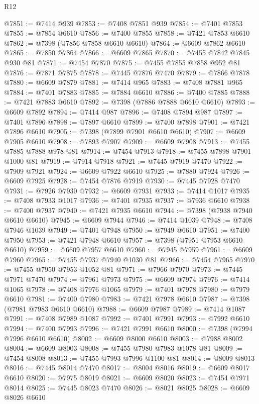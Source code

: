 \begin{lexlean}{R12}
\begin{coremodule}
{{{{{{{{{{{{{{{{{{{{{{{{{{{{{{{{{{{{{{{{{{{{{{{{{{{{{{{{{{{{{{{{{{{{{{{{{{{{{{{{{{@7851 := @7414 @939
@7853 := @7408 @7851 @939
@7854 := @7401 @7853
@7855 := @7854 @6610
@7856 := @7400 @7855
@7858 := @7421 @7853 @6610
@7862 := @7398 (@7856 @7858 @6610 @6610)
@7864 := @6609 @7862 @6610
@7865 := @7850 @7864
@7866 := @6609 @7865
@7870 := @7455 @7842 @7845 @930 @81
@7871 := @7454 @7870
@7875 := @7455 @7855 @7858 @952 @81
@7876 := @7871 @7875
@7878 := @7445 @7876 @7470
@7879 := @7866 @7878
@7880 := @6609 @7879
@7881 := @7414 @965
@7883 := @7408 @7881 @965
@7884 := @7401 @7883
@7885 := @7884 @6610
@7886 := @7400 @7885
@7888 := @7421 @7883 @6610
@7892 := @7398 (@7886 @7888 @6610 @6610)
@7893 := @6609 @7892
@7894 := @7414 @987
@7896 := @7408 @7894 @987
@7897 := @7401 @7896
@7898 := @7897 @6610
@7899 := @7400 @7898
@7901 := @7421 @7896 @6610
@7905 := @7398 (@7899 @7901 @6610 @6610)
@7907 := @6609 @7905 @6610
@7908 := @7893 @7907
@7909 := @6609 @7908
@7913 := @7455 @7885 @7888 @978 @81
@7914 := @7454 @7913
@7918 := @7455 @7898 @7901 @1000 @81
@7919 := @7914 @7918
@7921 := @7445 @7919 @7470
@7922 := @7909 @7921
@7924 := @6609 @7922 @6610
@7925 := @7880 @7924
@7926 := @6609 @7925
@7928 := @7454 @7876 @7919
@7930 := @7445 @7928 @7470
@7931 := @7926 @7930
@7932 := @6609 @7931
@7933 := @7414 @1017
@7935 := @7408 @7933 @1017
@7936 := @7401 @7935
@7937 := @7936 @6610
@7938 := @7400 @7937
@7940 := @7421 @7935 @6610
@7944 := @7398 (@7938 @7940 @6610 @6610)
@7945 := @6609 @7944
@7946 := @7414 @1039
@7948 := @7408 @7946 @1039
@7949 := @7401 @7948
@7950 := @7949 @6610
@7951 := @7400 @7950
@7953 := @7421 @7948 @6610
@7957 := @7398 (@7951 @7953 @6610 @6610)
@7959 := @6609 @7957 @6610
@7960 := @7945 @7959
@7961 := @6609 @7960
@7965 := @7455 @7937 @7940 @1030 @81
@7966 := @7454 @7965
@7970 := @7455 @7950 @7953 @1052 @81
@7971 := @7966 @7970
@7973 := @7445 @7971 @7470
@7974 := @7961 @7973
@7975 := @6609 @7974
@7976 := @7414 @1065
@7978 := @7408 @7976 @1065
@7979 := @7401 @7978
@7980 := @7979 @6610
@7981 := @7400 @7980
@7983 := @7421 @7978 @6610
@7987 := @7398 (@7981 @7983 @6610 @6610)
@7988 := @6609 @7987
@7989 := @7414 @1087
@7991 := @7408 @7989 @1087
@7992 := @7401 @7991
@7993 := @7992 @6610
@7994 := @7400 @7993
@7996 := @7421 @7991 @6610
@8000 := @7398 (@7994 @7996 @6610 @6610)
@8002 := @6609 @8000 @6610
@8003 := @7988 @8002
@8004 := @6609 @8003
@8008 := @7455 @7980 @7983 @1078 @81
@8009 := @7454 @8008
@8013 := @7455 @7993 @7996 @1100 @81
@8014 := @8009 @8013
@8016 := @7445 @8014 @7470
@8017 := @8004 @8016
@8019 := @6609 @8017 @6610
@8020 := @7975 @8019
@8021 := @6609 @8020
@8023 := @7454 @7971 @8014
@8025 := @7445 @8023 @7470
@8026 := @8021 @8025
@8028 := @6609 @8026 @6610
}}}}}}}}}}}}}}}}}}}}}}}}}}}}}}}}}}}}}}}}}}}}}}}}}}}}}}}}}}}}}}}}}}}}}}}}}}}}}}}}}}
\end{coremodule}
\end{lexlean}
